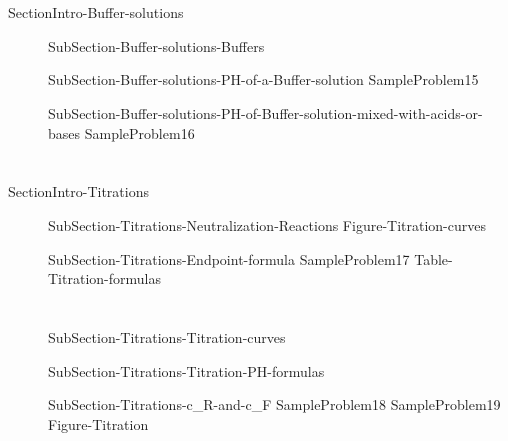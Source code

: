 \documentclass[main.tex]{subfiles}
\newcommand\chapterlabel{Ch-acidbase}\setcounter{figurenewcounter}{0}\setcounter{tablenewcounter}{0}\setcounter{formulanewcounter}{0}
\begin{document}
\section{\color{blue!30!black}{Buffer solutions}}{SectionIntro-Buffer-solutions}
\sloppy\begin{description}
\item[] {SubSection-Buffer-solutions-Buffers}
\item[] {SubSection-Buffer-solutions-PH-of-a-Buffer-solution}
{SampleProblem15}
\item[] {SubSection-Buffer-solutions-PH-of-Buffer-solution-mixed-with-acids-or-bases}%
{SampleProblem16}%
\end{description}

\section{\color{blue!30!black}{Titrations}}{SectionIntro-Titrations}
\sloppy\begin{description}
\item[] {SubSection-Titrations-Neutralization-Reactions}
{Figure-Titration-curves}%
\item[] {SubSection-Titrations-Endpoint-formula}
{SampleProblem17}
{Table-Titration-formulas}%
\end{description}

\section{\color{blue!30!black}{Titrations curves}}
\sloppy\begin{description}
\item[] {SubSection-Titrations-Titration-curves}
\item[] 
{SubSection-Titrations-Titration-PH-formulas}
\item[] 
{SubSection-Titrations-c_R-and-c_F}
{SampleProblem18}
{SampleProblem19}
{Figure-Titration}
\end{description}
\end{document}
